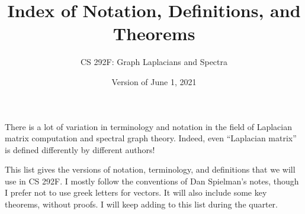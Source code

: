 \documentclass[11pt]{article}
\begin{document}
\title{Index of Notation, Definitions, and Theorems}
\author{CS 292F: Graph Laplacians and Spectra}
\date{Version of June 1, 2021}
\maketitle

There is a lot of variation in terminology and notation in
the field of Laplacian matrix computation and spectral graph 
theory.  
Indeed, even ``Laplacian matrix'' is defined differently by
different authors!

This list gives the versions of notation, terminology, and definitions 
that we will use in CS 292F.
I mostly follow the conventions of Dan Spielman's notes, 
though I prefer not to use greek letters for vectors.
It will also include some key theorems, without proofs.
I will keep adding to this list during the quarter.
\end{document}
